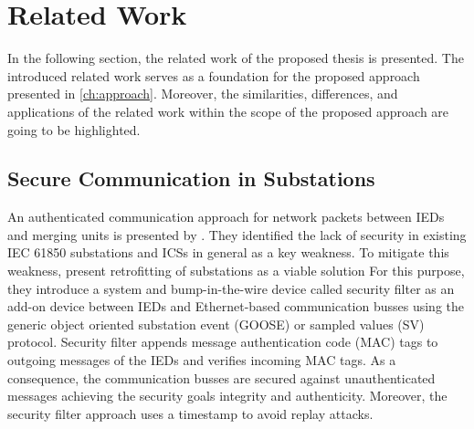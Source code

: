 \chapter{Related Work}
\label{ch:relatedwork}
In the following section, the related work of the proposed thesis is presented.
The introduced related work serves as a foundation for the proposed approach presented in \autoref{ch:approach}.
Moreover, the similarities, differences, and applications of the related work within the scope of the proposed approach are going to be highlighted.

\section{Secure Communication in Substations}
An authenticated communication approach for network packets between IEDs and merging units is presented by \citeauthor{Ishchenko2018} \cite{Ishchenko2018}.
They identified the lack of security in existing IEC 61850 substations and ICSs in general as a key weakness.
To mitigate this weakness, \citeauthor{Ishchenko2018} present retrofitting of substations as a viable solution
For this purpose, they introduce a system and bump-in-the-wire device called security filter as an add-on device between IEDs and Ethernet-based communication busses using the generic object oriented substation event (GOOSE) or sampled values (SV) protocol.
Security filter appends message authentication code (MAC) tags to outgoing messages of the IEDs and verifies incoming MAC tags.
As a consequence, the communication busses are secured against unauthenticated messages achieving the security goals integrity and authenticity.
Moreover, the security filter approach uses a timestamp to avoid replay attacks.

